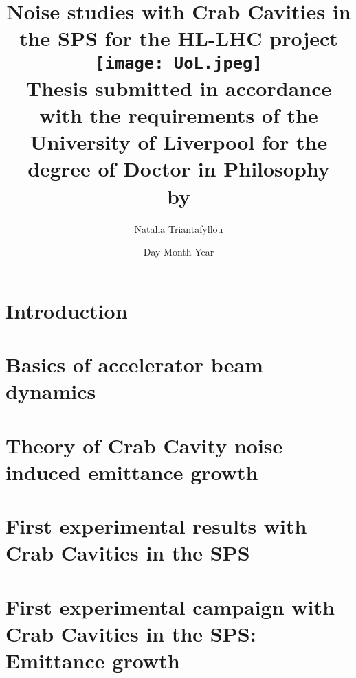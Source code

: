 \documentclass[12pt,twoside]{report} %
\begin{document}
\frontmatter
\title{
{Noise studies with Crab Cavities in the SPS for the HL-LHC project}\\
{\texttt{[image: UoL.jpeg]}} \\
{\large Thesis submitted in accordance with the requirements of the University of Liverpool for the degree of Doctor in Philosophy \\ by}
}
\author{ Natalia Triantafyllou}
\date{Day Month Year}
\maketitle
\newpage




\listoffigures
{}
\listoftables
{}

\newpage

\thispagestyle{plain} %

\listofsymbols
{}

\tableofcontents

\mainmatter

\chapter{Introduction}


\chapter{Basics of accelerator beam dynamics}


\chapter{Theory of Crab Cavity noise induced emittance growth}


\chapter{First experimental results with Crab Cavities in the SPS}


\chapter{First experimental campaign with Crab Cavities in the SPS: Emittance growth}

\end{document}
